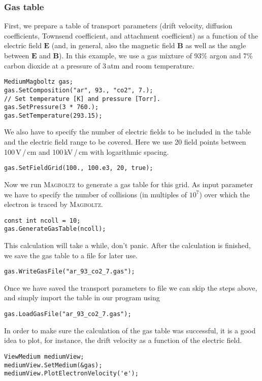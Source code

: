 \subsubsection{Gas table}
First, we prepare a table of transport parameters 
(drift velocity, diffusion coefficients, Townsend coefficient,
and attachment coefficient) as a function 
of the electric field \(\mathbf{E}\)  
(and, in general, also the magnetic field \(\mathbf{B}\) 
as well as the angle between \(\mathbf{E}\) and \(\mathbf{B}\)).
In this example, we use a gas mixture of 93\% argon and 7\% 
carbon dioxide at a pressure of 3\,atm and room temperature.
\begin{lstlisting}
MediumMagboltz gas;
gas.SetComposition("ar", 93., "co2", 7.);
// Set temperature [K] and pressure [Torr].
gas.SetPressure(3 * 760.);
gas.SetTemperature(293.15);
\end{lstlisting} 
We also have to specify the number of electric fields to be 
included in the table and the electric field range to be covered. 
Here we use 20 field points between 100\,V\,/\,cm and 100\,kV\,/\,cm 
with logarithmic spacing. 
\begin{lstlisting}
gas.SetFieldGrid(100., 100.e3, 20, true);
\end{lstlisting}
Now we run \textsc{Magboltz} to generate a gas table for this grid. 
As input parameter we have to specify the number of collisions 
(in multiples of \(10^{7}\)) over which the electron is traced 
by \textsc{Magboltz}.
\begin{lstlisting}
const int ncoll = 10;
gas.GenerateGasTable(ncoll);
\end{lstlisting}
This calculation will take a while, don't panic. 
After the calculation is finished, we save the gas table to a 
file for later use.
\begin{lstlisting}
gas.WriteGasFile("ar_93_co2_7.gas");
\end{lstlisting}
Once we have saved the transport parameters to file 
we can skip the steps above, 
and simply import the table in our program using
\begin{lstlisting}
gas.LoadGasFile("ar_93_co2_7.gas");
\end{lstlisting} 

In order to make sure the calculation of the gas table was successful, 
it is a good idea to plot, for instance, 
the drift velocity as a function of the electric field.
\begin{lstlisting}
ViewMedium mediumView;
mediumView.SetMedium(&gas);
mediumView.PlotElectronVelocity('e');
\end{lstlisting}
